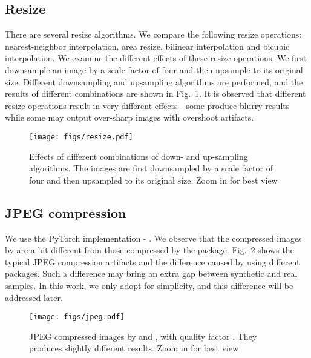 \documentclass[10pt,twocolumn,letterpaper]{article}
\begin{document}
\subsection{Resize}
There are several resize algorithms.
We compare the following resize operations: nearest-neighbor interpolation, area resize, bilinear interpolation and bicubic interpolation.
We examine the different effects of these resize operations. We first downsample an image by a scale factor of four and then upsample to its original size. Different downsampling and upsampling algorithms are performed, and the results of different combinations are shown in Fig.~\ref{fig:resize}.
It is observed that different resize operations result in very different effects - some produce blurry results while some may output over-sharp images with overshoot artifacts.

\begin{figure}[h]
\begin{center}
\texttt{[image: figs/resize.pdf]}
	\end{center}
	\vspace{-0.5cm}
	\caption{Effects of different combinations of down- and up-sampling algorithms. The images are first downsampled by a scale factor of four and then upsampled to its original size. Zoom in for best view}
	\label{fig:resize}
\end{figure}

\subsection{JPEG compression}
We use the PyTorch implementation - .
We observe that the compressed images by  are a bit different from those compressed by the  package. Fig.~\ref{fig:jpeg} shows the typical JPEG compression artifacts and the difference caused by using different packages.
Such a difference may bring an extra gap between synthetic and real samples.
In this work,  we only adopt  for simplicity, and this difference will be addressed later.

\begin{figure}[h]
\begin{center}
\texttt{[image: figs/jpeg.pdf]}
	\end{center}
	\vspace{-0.5cm}
	\caption{JPEG compressed images by  and , with quality factor . They produces slightly different results. Zoom in for best view}
	\label{fig:jpeg}
\end{figure}
\end{document}

